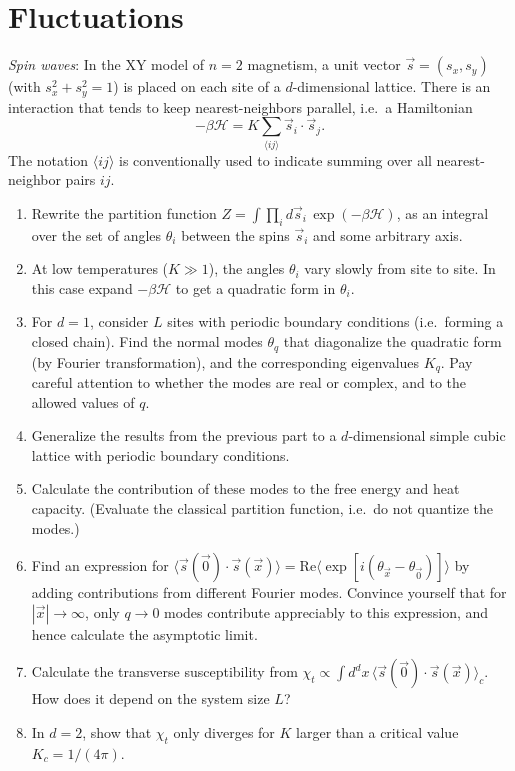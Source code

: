\chapter{Fluctuations}

\begin{problem}
    \textit{Spin waves}: In the XY model of $n=2$ magnetism, a unit vector $\vec{s} = (s_x, s_y)$ (with $s_x^2 + s_y^2 = 1$) is placed on each site of a $d$-dimensional lattice. There is an interaction that tends to keep nearest-neighbors parallel, i.e.\ a Hamiltonian
    \[
        -\beta\mathcal{H} = K\sum_{\langle ij\rangle}\vec{s}_i\cdot\vec{s}_j.
    \]
    The notation $\langle ij\rangle$ is conventionally used to indicate summing over all nearest-neighbor pairs $ij$.

    \begin{enumerate}
        \item[(a)] Rewrite the partition function $Z = \int\prod_i d\vec{s}_i\,\exp(-\beta\mathcal{H})$, as an integral over the set of angles $\theta_i$ between the spins $\vec{s}_i$ and some arbitrary axis.

        \item[(b)] At low temperatures ($K \gg 1$), the angles $\theta_i$ vary slowly from site to site. In this case expand $-\beta\mathcal{H}$ to get a quadratic form in $\theta_i$.

        \item[(c)] For $d = 1$, consider $L$ sites with periodic boundary conditions (i.e.\ forming a closed chain). Find the normal modes $\theta_q$ that diagonalize the quadratic form (by Fourier transformation), and the corresponding eigenvalues $K_q$. Pay careful attention to whether the modes are real or complex, and to the allowed values of $q$.

        \item[(d)] Generalize the results from the previous part to a $d$-dimensional simple cubic lattice with periodic boundary conditions.

        \item[(e)] Calculate the contribution of these modes to the free energy and heat capacity. (Evaluate the classical partition function, i.e.\ do not quantize the modes.)

        \item[(f)] Find an expression for $\langle\vec{s}(\vec{0})\cdot\vec{s}(\vec{x})\rangle = \text{Re}\langle\exp[i(\theta_{\vec{x}} - \theta_{\vec{0}})]\rangle$ by adding contributions from different Fourier modes. Convince yourself that for $|\vec{x}| \to \infty$, only $q \to 0$ modes contribute appreciably to this expression, and hence calculate the asymptotic limit.

        \item[(g)] Calculate the transverse susceptibility from $\chi_t \propto \int d^dx\,\langle\vec{s}(\vec{0})\cdot\vec{s}(\vec{x})\rangle_c$. How does it depend on the system size $L$?

        \item[(h)] In $d = 2$, show that $\chi_t$ only diverges for $K$ larger than a critical value $K_c = 1/(4\pi)$.
    \end{enumerate}
\end{problem}

